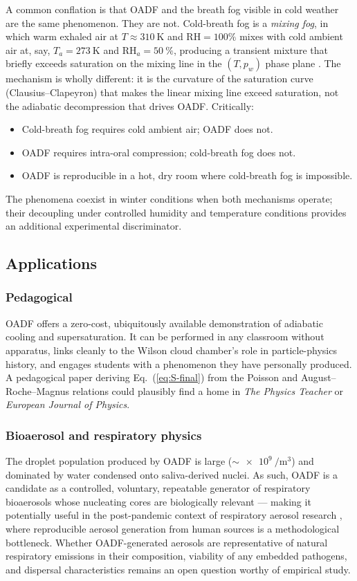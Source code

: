 \documentclass[11pt,a4paper]{article}
\theoremstyle{definition}
\theoremstyle{plain}
\begin{document}
A common conflation is that OADF and the breath fog visible in cold weather are the same phenomenon. They are not. Cold-breath fog is a \emph{mixing fog}, in which warm exhaled air at $T \approx \SI{310}{\kelvin}$ and $\mathrm{RH} = 100\%$ mixes with cold ambient air at, say, $T_a = \SI{273}{\kelvin}$ and $\mathrm{RH}_a = \SI{50}{\percent}$, producing a transient mixture that briefly exceeds saturation on the mixing line in the $(T, p_w)$ phase plane \citep{Bohren1998}. The mechanism is wholly different: it is the curvature of the saturation curve (Clausius–Clapeyron) that makes the linear mixing line exceed saturation, not the adiabatic decompression that drives OADF. Critically:
\begin{itemize}
  \item Cold-breath fog requires cold ambient air; OADF does not.
  \item OADF requires intra-oral compression; cold-breath fog does not.
  \item OADF is reproducible in a hot, dry room where cold-breath fog is impossible.
\end{itemize}
The phenomena coexist in winter conditions when both mechanisms operate; their decoupling under controlled humidity and temperature conditions provides an additional experimental discriminator.

\subsection{Applications}

\subsubsection{Pedagogical}
OADF offers a zero-cost, ubiquitously available demonstration of adiabatic cooling and supersaturation. It can be performed in any classroom without apparatus, links cleanly to the Wilson cloud chamber's role in particle-physics history, and engages students with a phenomenon they have personally produced. A pedagogical paper deriving Eq.~(\ref{eq:S-final}) from the Poisson and August–Roche–Magnus relations could plausibly find a home in \emph{The Physics Teacher} or \emph{European Journal of Physics}.

\subsubsection{Bioaerosol and respiratory physics}
The droplet population produced by OADF is large ($\sim\!\SI{e9}{\per\cubic\meter}$) and dominated by water condensed onto saliva-derived nuclei. As such, OADF is a candidate as a controlled, voluntary, repeatable generator of respiratory bioaerosols whose nucleating cores are biologically relevant — making it potentially useful in the post-pandemic context of respiratory aerosol research \citep{Asadi2019,Bourouiba2020}, where reproducible aerosol generation from human sources is a methodological bottleneck. Whether OADF-generated aerosols are representative of natural respiratory emissions in their composition, viability of any embedded pathogens, and dispersal characteristics remains an open question worthy of empirical study.
\end{document}
